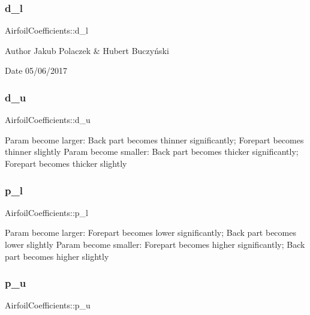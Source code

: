 \subsubsection{\texorpdfstring{d\+\_\+l}{d\_l}}
{\footnotesize\ttfamily Airfoil\+Coefficients\+::d\+\_\+l}

\begin{DoxyAuthor}{Author}
Jakub Polaczek \& Hubert Buczyński 
\end{DoxyAuthor}
\begin{DoxyDate}{Date}
05/06/2017 
\end{DoxyDate}
\hypertarget{struct_airfoil_coefficients_ac294ea7a2fc38be4f61680e0e30290a1}{}\label{struct_airfoil_coefficients_ac294ea7a2fc38be4f61680e0e30290a1} 
\subsubsection{\texorpdfstring{d\+\_\+u}{d\_u}}
{\footnotesize\ttfamily Airfoil\+Coefficients\+::d\+\_\+u}

Param become larger\+: Back part becomes thinner significantly; Forepart becomes thinner slightly Param become smaller\+: Back part becomes thicker significantly; Forepart becomes thicker slightly \hypertarget{struct_airfoil_coefficients_a1b195a3d499c8c050ccb05faeba65c9f}{}\label{struct_airfoil_coefficients_a1b195a3d499c8c050ccb05faeba65c9f} 
\subsubsection{\texorpdfstring{p\+\_\+l}{p\_l}}
{\footnotesize\ttfamily Airfoil\+Coefficients\+::p\+\_\+l}

Param become larger\+: Forepart becomes lower significantly; Back part becomes lower slightly Param become smaller\+: Forepart becomes higher significantly; Back part becomes higher slightly \hypertarget{struct_airfoil_coefficients_a206b443b0e4e9ab91ec2d4f6570f687d}{}\label{struct_airfoil_coefficients_a206b443b0e4e9ab91ec2d4f6570f687d} 
\subsubsection{\texorpdfstring{p\+\_\+u}{p\_u}}
{\footnotesize\ttfamily Airfoil\+Coefficients\+::p\+\_\+u}

